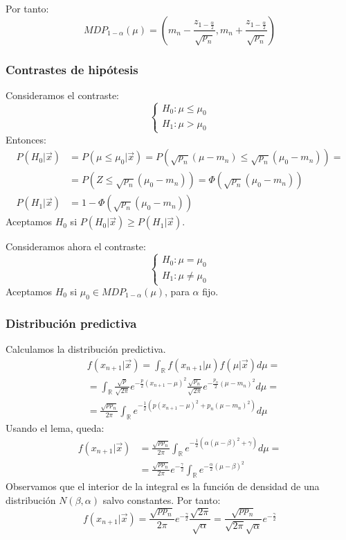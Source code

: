 Por tanto:
$$MDP_{1-\alpha}(\mu) = \left(m_n - \frac{z_{1-\frac{\alpha}{2}}}{\sqrt{p_n}}, m_n + \frac{z_{1-\frac{\alpha}{2}}}{\sqrt{p_n}}\right)$$

\subsubsection*{Contrastes de hipótesis}
Consideramos el contraste:
$$\begin{cases}
        H_0: \mu \leq \mu_0 \\
        H_1: \mu > \mu_0
    \end{cases}$$
Entonces:
\begin{align*}
    P(H_0|\vec{x}) & = P(\mu \leq \mu_0|\vec{x}) = P(\sqrt{p_n}(\mu-m_n) \leq \sqrt{p_n}(\mu_0-m_n)) = \\
                   & = P(Z \leq \sqrt{p_n}(\mu_0-m_n)) = \varPhi(\sqrt{p_n}(\mu_0-m_n))                \\
    P(H_1|\vec{x}) & = 1 - \varPhi(\sqrt{p_n}(\mu_0-m_n))
\end{align*}
Aceptamos $H_0$ si $P(H_0|\vec{x}) \geq P(H_1|\vec{x})$.

Consideramos ahora el contraste:
$$\begin{cases}
        H_0: \mu = \mu_0 \\
        H_1: \mu \neq \mu_0
    \end{cases}$$
Aceptamos $H_0$ si $\mu_0 \in MDP_{1-\alpha}(\mu)$, para $\alpha$ fijo.

\subsubsection*{Distribución predictiva}
Calculamos la distribución predictiva.
\begin{align*}
     & f(x_{n+1}|\vec{x}) = \int_\mathbb{R} f(x_{n+1}|\mu)f(\mu|\vec{x})d\mu =                                                                           \\
     & = \int_\mathbb{R} \frac{\sqrt{p}}{\sqrt{2\pi}} e^{-\frac{p}{2}(x_{n+1}-\mu)^2} \frac{\sqrt{p_n}}{\sqrt{2\pi}} e^{-\frac{p_n}{2}(\mu-m_n)^2}d\mu = \\
     & = \frac{\sqrt{pp_n}}{2\pi} \int_\mathbb{R} e^{-\frac{1}{2}(p(x_{n+1}-\mu)^2 + p_n(\mu-m_n)^2)}d\mu
\end{align*}
Usando el lema, queda:
\begin{align*}
    f(x_{n+1}|\vec{x}) & = \frac{\sqrt{pp_n}}{2\pi} \int_\mathbb{R} e^{-\frac{1}{2}(\alpha(\mu-\beta)^2+\gamma)}d\mu =       \\
                       & = \frac{\sqrt{pp_n}}{2\pi} e^{-\frac{\gamma}{2}} \int_\mathbb{R} e^{-\frac{\alpha}{2}(\mu-\beta)^2}
\end{align*}
Observamos que el interior de la integral es la función de densidad de una distribución $N(\beta, \alpha)$ salvo constantes.
Por tanto:
$$f(x_{n+1}|\vec{x}) = \frac{\sqrt{pp_n}}{2\pi} e^{-\frac{\gamma}{2}} \frac{\sqrt{2\pi}}{\sqrt{\alpha}} = \frac{\sqrt{pp_n}}{\sqrt{2\pi}\sqrt{\alpha}}e^{-\frac{\gamma}{2}}$$

